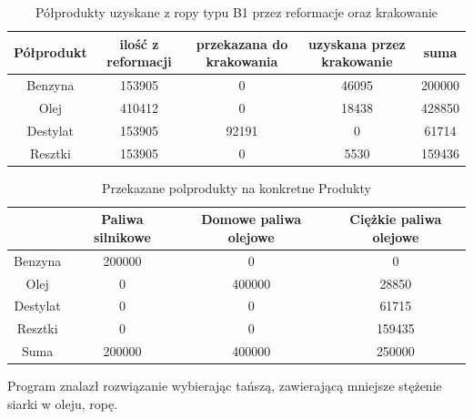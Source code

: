 \begin{table}[ht]
    \begin{center}
        \begin{tabular}{| c | c | c | c || c |} 
            \hline
            \rowcolor{lgray}
            Półprodukt & ilość z reformacji & przekazana do krakowania & uzyskana przez krakowanie& suma \\
            \hline
            Benzyna & 153905 & 0 & 46095 & 200000\\
            \hline
            Olej & 410412 & 0 & 18438 & 428850\\ 
            \hline
            Destylat & 153905 & 92191 & 0 & 61714\\
            \hline
            Resztki & 153905 & 0 & 5530 & 159436\\
            \hline
        \end{tabular}
        \caption{Półprodukty uzyskane z ropy typu B1 przez reformacje oraz krakowanie}
        \label{tabela_zad3_b}
    \end{center}
\end{table}


\begin{table}[ht]
    \begin{center}
        \begin{tabular}{| c | c | c | c |} 
            \hline
            \rowcolor{lgray}
              & Paliwa silnikowe & Domowe paliwa olejowe & Ciężkie paliwa olejowe \\
            \hline
            Benzyna & 200000 & 0 & 0 \\
            \hline
            Olej & 0 & 400000 & 28850 \\ 
            \hline
            Destylat & 0 & 0 & 61715\\
            \hline
            Resztki & 0 & 0 & 159435\\
            \hline
            \hline
            Suma & 200000 & 400000 & 250000 \\
            \hline
        \end{tabular}
        \caption{Przekazane polprodukty na konkretne Produkty}
        \label{tabela_zad3_c}
    \end{center}
\end{table}


Program znalazł rozwiązanie wybierając tańszą, zawierającą mniejsze stężenie siarki w oleju, ropę. 